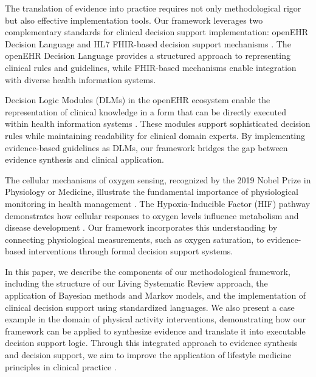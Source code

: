The translation of evidence into practice requires not only methodological rigor but also effective implementation tools. Our framework leverages two complementary standards for clinical decision support implementation: openEHR Decision Language \cite{beale2021decision} and HL7 FHIR-based decision support mechanisms \cite{lichtner2023representation}. The openEHR Decision Language provides a structured approach to representing clinical rules and guidelines, while FHIR-based mechanisms enable integration with diverse health information systems.

Decision Logic Modules (DLMs) in the openEHR ecosystem enable the representation of clinical knowledge in a form that can be directly executed within health information systems \cite{silva2024openehr}. These modules support sophisticated decision rules while maintaining readability for clinical domain experts. By implementing evidence-based guidelines as DLMs, our framework bridges the gap between evidence synthesis and clinical application.

The cellular mechanisms of oxygen sensing, recognized by the 2019 Nobel Prize in Physiology or Medicine, illustrate the fundamental importance of physiological monitoring in health management \cite{nobel2019physiology}. The Hypoxia-Inducible Factor (HIF) pathway demonstrates how cellular responses to oxygen levels influence metabolism and disease development \cite{bosco2020mitochondrial}. Our framework incorporates this understanding by connecting physiological measurements, such as oxygen saturation, to evidence-based interventions through formal decision support systems.

In this paper, we describe the components of our methodological framework, including the structure of our Living Systematic Review approach, the application of Bayesian methods and Markov models, and the implementation of clinical decision support using standardized languages. We also present a case example in the domain of physical activity interventions, demonstrating how our framework can be applied to synthesize evidence and translate it into executable decision support logic. Through this integrated approach to evidence synthesis and decision support, we aim to improve the application of lifestyle medicine principles in clinical practice \cite{santos2023improving}.
